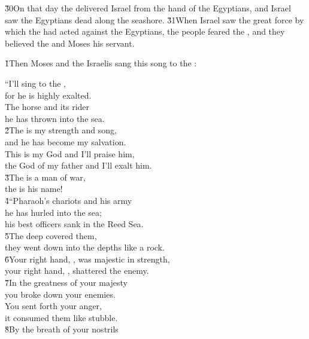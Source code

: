 \v{30}On that day the  delivered Israel from the hand of the Egyptians, and Israel saw the Egyptians dead along the seashore. \v{31}When Israel saw the great force by which the  had acted against the Egyptians, the people feared the , and they believed the  and Moses his servant.

\v{1}Then Moses and the Israelis sang this song to the :

\begin{poetry}
\poeml ``I'll sing to the , \\
\poemll    for he is highly exalted. \\
\poeml The horse and its rider \\
\poemll    he has thrown into the sea. \\
\poeml \v{2}The  is my strength and song, \\
\poemll    and he has become my salvation. \\
\poeml This is my God and I'll praise him, \\
\poemll    the God of my father and I'll exalt him. \\
\poeml \v{3}The  is a man of war, \\
\poemll    the  is his name! \\
\poeml \v{4}``Pharaoh's chariots and his army \\
\poemll    he has hurled into the sea; \\
\poemlll       his best officers sank in the Reed Sea. \\
\poeml \v{5}The deep covered them, \\
\poemll    they went down into the depths like a rock. \\
\poeml \v{6}Your right hand, , was majestic in strength, \\
\poemll    your right hand, , shattered the enemy. \\
\poeml \v{7}In the greatness of your majesty \\
\poemll    you broke down your enemies. \\
\poeml You sent forth your anger, \\
\poemll    it consumed them like stubble. \\
\poeml \v{8}By the breath of your nostrils \\

\end{poetry}
